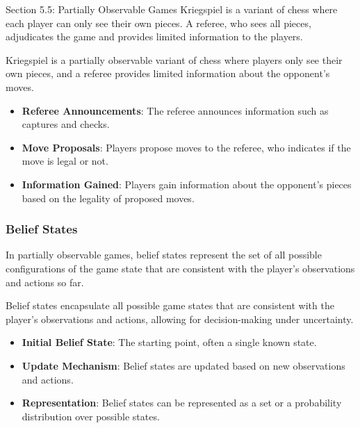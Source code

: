 \begin{notes}{Section 5.5: Partially Observable Games}
    Kriegspiel is a variant of chess where each player can only see their own pieces. A referee, who sees all pieces, adjudicates the game and provides limited information to the players.
    
    \begin{highlight}
        Kriegspiel is a partially observable variant of chess where players only see their own pieces, and a referee provides limited information about the opponent's moves.
        
        \begin{itemize}
            \item \textbf{Referee Announcements}: The referee announces information such as captures and checks.
            \item \textbf{Move Proposals}: Players propose moves to the referee, who indicates if the move is legal or not.
            \item \textbf{Information Gained}: Players gain information about the opponent's pieces based on the legality of proposed moves.
        \end{itemize}
    \end{highlight}
    
    \subsubsection*{Belief States}
    
    In partially observable games, belief states represent the set of all possible configurations of the game state that are consistent with the player's observations and actions so far.
    
    \begin{highlight}
        Belief states encapsulate all possible game states that are consistent with the player's observations and actions, allowing for decision-making under uncertainty.
        
        \begin{itemize}
            \item \textbf{Initial Belief State}: The starting point, often a single known state.
            \item \textbf{Update Mechanism}: Belief states are updated based on new observations and actions.
            \item \textbf{Representation}: Belief states can be represented as a set or a probability distribution over possible states.
        \end{itemize}
    \end{highlight}
    

\end{notes}
